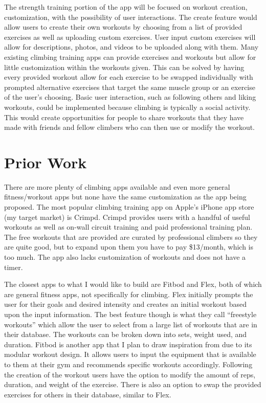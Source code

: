 \documentclass[10pt,twocolumn]{article}
\begin{document}
	The strength training portion of the app will be focused on workout creation, customization, with the possibility of user interactions. The create feature would allow users to create their own workouts by choosing from a list of provided exercises as well as uploading custom exercises. User input custom exercises will allow for descriptions, photos, and videos to be uploaded along with them. Many existing climbing training apps can provide exercises and workouts but allow for little customization within the workouts given. This can be solved by having every provided workout allow for each exercise to be swapped individually with prompted alternative exercises that target the same muscle group or an exercise of the user’s choosing. Basic user interaction, such as following others and liking workouts, could be implemented because climbing is typically a social activity. This would create opportunities for people to share workouts that they have made with friends and fellow climbers who can then use or modify the workout.
	
\section{Prior Work}

    There are more plenty of climbing apps available and even more general fitness/workout apps but none have the same customization as the app being proposed. The most popular climbing training app on Apple’s iPhone app store (my target market) is Crimpd. Crimpd provides users with a handful of useful workouts as well as on-wall circuit training and paid professional training plan. The free workouts that are provided are curated by professional climbers so they are quite good, but to expand upon them you have to pay \$13/month, which is too much. The app also lacks customization of workouts and does not have a timer. 

	The closest apps to what I would like to build are Fitbod and Flex, both of which are general fitness apps, not specifically for climbing. Flex initially prompts the user for their goals and desired intensity and creates an initial workout based upon the input information. The best feature though is what they call “freestyle workouts” which allow the user to select from a large list of workouts that are in their database. The workouts can be broken down into sets, weight used, and duration. Fitbod is another app that I plan to draw inspiration from due to its modular workout design. It allows users to input the equipment that is available to them at their gym and recommends specific workouts accordingly. Following the creation of the workout users have the option to modify the amount of reps, duration, and weight of the exercise. There is also an option to swap the provided exercises for others in their database, similar to Flex.
\end{document}
